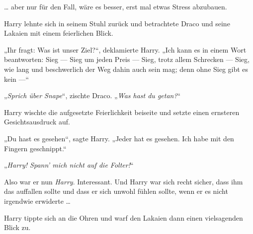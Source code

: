 … aber nur für den Fall, wäre es besser, erst mal etwas Stress abzubauen.

Harry lehnte sich in seinem Stuhl zurück und betrachtete Draco und seine Lakaien mit einem feierlichen Blick.

„Ihr fragt: Was ist unser Ziel?“, deklamierte Harry.
„Ich kann es in einem Wort beantworten: Sieg — Sieg um jeden Preis — Sieg, trotz allem Schrecken — Sieg, wie lang und beschwerlich der Weg dahin auch sein mag; denn ohne Sieg gibt es kein —“ %

„\emph{Sprich über Snape}“, zischte Draco.
„\emph{Was hast du getan?}“

Harry wischte die aufgesetzte Feierlichkeit beiseite und setzte einen ernsteren Gesichtsausdruck auf.

„Du hast es gesehen“, sagte Harry.
„Jeder hat es gesehen. Ich habe mit den Fingern geschnippt.“

„\emph{Harry! Spann’ mich nicht auf die Folter!}“

Also war er nun \emph{Harry}. Interessant. Und Harry war sich recht sicher, dass ihm das auffallen sollte und dass er sich unwohl fühlen sollte, wenn er es nicht irgendwie erwiderte …

Harry tippte sich an die Ohren und warf den Lakaien dann einen vielsagenden Blick zu.

